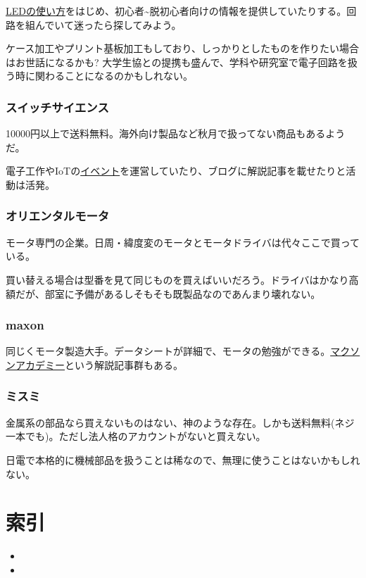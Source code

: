 \documentclass[letterpaper,10pt,dvipdfmx]{sphinxmanual}
\begin{document}
\href{http://www.marutsu.co.jp/pc/static/large\_order/led}{LEDの使い方}をはじめ、初心者\textasciitilde{}脱初心者向けの情報を提供していたりする。回路を組んでいて迷ったら探してみよう。

ケース加工やプリント基板加工もしており、しっかりとしたものを作りたい場合はお世話になるかも? 大学生協との提携も盛んで、学科や研究室で電子回路を扱う時に関わることになるのかもしれない。


\subsection{スイッチサイエンス}
\label{\detokenize{buy_parts:}}\label{\detokenize{buy_parts:id17}}
10000円以上で送料無料。海外向け製品など秋月で扱ってない商品もあるようだ。

電子工作やIoTの\href{https://connpass.com/search/?q=\%E3\%82\%B9\%E3\%82\%A4\%E3\%83\%83\%E3\%83\%81\%E3\%82\%B5\%E3\%82\%A4\%E3\%82\%A8\%E3\%83\%B3\%E3\%82\%B9}{イベント}を運営していたり、ブログに解説記事を載せたりと活動は活発。


\subsection{オリエンタルモータ}
\label{\detokenize{buy_parts:}}\label{\detokenize{buy_parts:id18}}
モータ専門の企業。日周・緯度変のモータとモータドライバは代々ここで買っている。

買い替える場合は型番を見て同じものを買えばいいだろう。ドライバはかなり高額だが、部室に予備があるしそもそも既製品なのであんまり壊れない。


\subsection{maxon}
\label{\detokenize{buy_parts:maxon}}
同じくモータ製造大手。データシートが詳細で、モータの勉強ができる。\href{http://academy.maxonjapan.co.jp/}{マクソンアカデミー}という解説記事群もある。


\subsection{ミスミ}
\label{\detokenize{buy_parts:}}\label{\detokenize{buy_parts:id19}}
金属系の部品なら買えないものはない、神のような存在。しかも送料無料(ネジ一本でも)。ただし法人格のアカウントがないと買えない。

日電で本格的に機械部品を扱うことは稀なので、無理に使うことはないかもしれない。


\chapter{索引}
\label{\detokenize{index:id2}}\begin{itemize}
\item {} 

\item {} 

\end{itemize}



\renewcommand{\indexname}{索引}
\printindex
\end{document}

